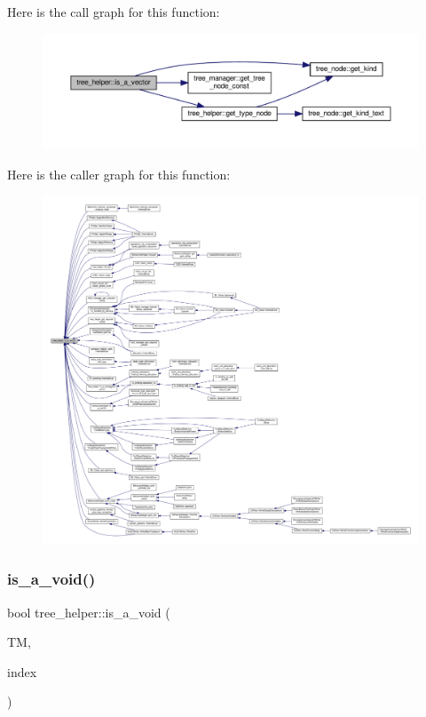 Here is the call graph for this function\+:
\nopagebreak
\begin{figure}[H]
\begin{center}
\leavevmode
\includegraphics[width=350pt]{d7/d99/classtree__helper_ac4d19443208195cc70181f00f9f0d40e_cgraph}
\end{center}
\end{figure}
Here is the caller graph for this function\+:
\nopagebreak
\begin{figure}[H]
\begin{center}
\leavevmode
\includegraphics[width=350pt]{d7/d99/classtree__helper_ac4d19443208195cc70181f00f9f0d40e_icgraph}
\end{center}
\end{figure}
\mbox{\label{classtree__helper_a262d8de0a44b4f37fa1ecfc0b14b79e8}} 
\subsubsection{\texorpdfstring{is\+\_\+a\+\_\+void()}{is\_a\_void()}}
{\footnotesize\ttfamily bool tree\+\_\+helper\+::is\+\_\+a\+\_\+void (\begin{DoxyParamCaption}\item[{const \hyperlink{tree__manager_8hpp_a792e3f1f892d7d997a8d8a4a12e39346}{tree\+\_\+manager\+Const\+Ref} \&}]{TM,  }\item[{const unsigned int}]{index }\end{DoxyParamCaption})\hspace{0.3cm}{\ttfamily [static]}}



